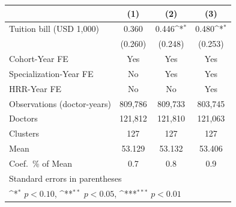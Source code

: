 {
\def\sym#1{\ifmmode^{#1}\else\(^{#1}\)\fi}
\begin{tabular}{l*{3}{c}}
\hline\hline
                    &\multicolumn{1}{c}{(1)}         &\multicolumn{1}{c}{(2)}         &\multicolumn{1}{c}{(3)}         \\
\hline
Tuition bill (USD 1,000)&       0.360         &       0.446\sym{*}  &       0.480\sym{*}  \\
                    &     (0.260)         &     (0.248)         &     (0.253)         \\
[1em]
Cohort-Year FE      &         Yes         &         Yes         &         Yes         \\
[1em]
Specialization-Year FE&          No         &         Yes         &         Yes         \\
[1em]
HRR-Year FE         &          No         &          No         &         Yes         \\
\hline
Observations (doctor-years)&     809,786         &     809,733         &     803,745         \\
Doctors             &     121,812         &     121,810         &     121,063         \\
Clusters            &         127         &         127         &         127         \\
Mean                &      53.129         &      53.132         &      53.406         \\
Coef.\ \% of Mean   &         0.7         &         0.8         &         0.9         \\
\hline\hline
\multicolumn{4}{l}{\footnotesize Standard errors in parentheses}\\
\multicolumn{4}{l}{\footnotesize \sym{*} \(p<0.10\), \sym{**} \(p<0.05\), \sym{***} \(p<0.01\)}\\
\end{tabular}
}
